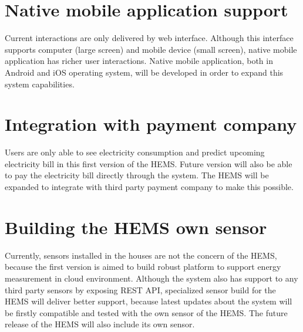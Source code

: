 \section{Native mobile application support}
Current interactions are only delivered by web interface. Although this interface supports computer (large screen) and mobile device (small screen), native mobile application has richer user interactions. Native mobile application, both in Android and iOS operating system, will be developed in order to expand this system capabilities. 

\section{Integration with payment company}
Users are only able to see electricity consumption and predict upcoming electricity bill in this first version of the HEMS. Future version will also be able to pay the electricity bill directly through the system. The HEMS will be expanded to integrate with third party payment company to make this possible.

\section{Building the HEMS own sensor}
Currently, sensors installed in the houses are not the concern of the HEMS, because the first version is aimed to build robust platform to support energy measurement in cloud environment. Although the system also has support to any third party sensors by exposing REST API, specialized sensor build for the HEMS will deliver better support, because latest updates about the system will be firstly compatible and tested with the own sensor of the HEMS. The future release of the HEMS will also include its own sensor.

